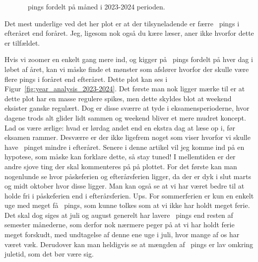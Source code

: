 \begin{article}
\begin{figure}[H]
	\centering
	\resizebox{\columnwidth}{!}{}
	\vspace{-20pt}
	\caption{\protect\coffee\ pings fordelt på måned i 2023-2024 perioden.}
	\label{fig:month_analysis_2023-2024}
\end{figure}

Det mest underlige ved det her plot er at der tilsyneladende er færre \coffee\ pings i efteråret end foråret. Jeg, ligesom nok også du kære læser, aner ikke hvorfor dette er tilfældet.

Hvis vi zoomer en enkelt gang mere ind, og kigger på \coffee\ pings fordelt på hver dag i løbet af året, kan vi måske finde et mønster som afslører hvorfor der skulle være flere pings i foråret end efteråret. Dette plot kan ses i Figur~\ref{fig:year_analysis_2023-2024}. Det første man nok ligger mærke til er at dette plot har en masse regulere spikes, men dette skyldes blot at weekend eksister ganske regulært.
Dog er disse sværre at tyde i eksamensperioderne, hvor dagene trods alt glider lidt sammen og weekend bliver et mere mudret koncept. Lad os være ærlige: hvad er lørdag andet end en ekstra dag at læse op i, før eksamen rammer.
Desværre er der ikke ligefrem noget som viser hvorfor vi skulle have \coffee\ pinget mindre i efteråret. Senere i denne artikel vil jeg komme ind på en hypotese, som måske kan forklare dette, så stay tuned! I mellemtiden er der andre sjove ting der skal kommenteres på på plottet.
For det første kan man nogenlunde se hvor påskeferien og efterårsferien ligger, da der er dyk i slut marts og midt oktober hvor disse ligger. Man kan også se at vi har været bedre til at holde fri i påskeferien end i efterårsferien. Ups.
For sommerferien er kun en enkelt uge med meget få \coffee\ pings, som kunne tolkes som at vi ikke har holdt meget ferie. Det skal dog siges at juli og august generelt har lavere \coffee\ pings end resten af semester månederne, som derfor nok nærmere peger på at vi har holdt ferie meget forskudt, med undtagelse af denne ene uge i juli, hvor mange af os har været væk.
Derudover kan man heldigvis se at mængden af \coffee\ pings er lav omkring juletid, som det bør være sig.

\begin{figure*}[t!]
	\centering
	\resizebox{2\columnwidth}{!}{}
	\vspace{-15pt}
	\caption{\protect\coffee\ pings fordelt på årets dag og måned i 2023-2024 perioden.}
	\label{fig:year_analysis_2023-2024}
\end{figure*}


\end{article}
